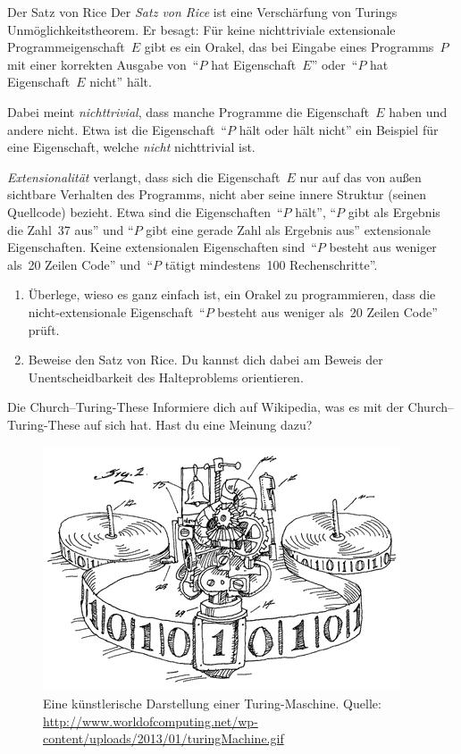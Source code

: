 \documentclass[twoside]{../zirkelblatt1415}
\theoremstyle{definition}
\theoremstyle{plain}
\theoremstyle{remark}
\begin{document}
\begin{aufgabeShaded}{Der Satz von Rice}
Der \emph{Satz von Rice} ist eine Verschärfung von Turings
Unmöglichkeitstheorem. Er besagt: Für keine nichttriviale extensionale
Programmeigenschaft~$E$ gibt es ein Orakel, das bei Eingabe
eines Programms~$P$ mit einer korrekten Ausgabe von~"`$P$ hat Eigenschaft~$E$"'
oder~"`$P$ hat Eigenschaft~$E$ nicht"' hält.

Dabei meint \emph{nichttrivial}, dass manche Programme die Eigenschaft~$E$
haben und andere nicht. Etwa ist die Eigenschaft~"`$P$ hält oder hält nicht"'
ein Beispiel für eine Eigenschaft, welche \emph{nicht} nichttrivial ist.

\emph{Extensionalität} verlangt, dass sich die Eigenschaft~$E$ nur auf das von
außen sichtbare Verhalten des Programms, nicht aber seine innere Struktur
(seinen Quellcode) bezieht. Etwa sind die Eigenschaften~"`$P$ hält"',
"`$P$ gibt als Ergebnis die Zahl~37 aus"' und "`$P$ gibt eine gerade Zahl als
Ergebnis aus"' extensionale Eigenschaften. Keine extensionalen Eigenschaften
sind~"`$P$ besteht aus weniger als~20 Zeilen Code"' und~"`$P$ tätigt
mindestens~100 Rechenschritte"'.

\begin{enumerate}
\item Überlege, wieso es ganz einfach ist, ein Orakel zu programmieren, dass
die nicht-extensionale Eigenschaft~"`$P$ besteht aus weniger als~20 Zeilen
Code"' prüft.
\item Beweise den Satz von Rice. Du kannst dich dabei am Beweis der
Unentscheidbarkeit des Halteproblems orientieren.
\end{enumerate}
\vspace{-1em}
\end{aufgabeShaded}

\begin{aufgabeShaded}{Die Church--Turing-These}
Informiere dich auf Wikipedia, was es mit der Church--Turing-These auf sich
hat. Hast du eine Meinung dazu?
\end{aufgabeShaded}

\begin{figure}[h]
  \centering
  \includegraphics[scale=0.7]{turing-machine}
  \caption{\label{abb:turing-maschine}Eine künstlerische Darstellung einer
  Turing-Maschine. Quelle:
  \url{http://www.worldofcomputing.net/wp-content/uploads/2013/01/turingMachine.gif}}
\end{figure}
\end{document}
